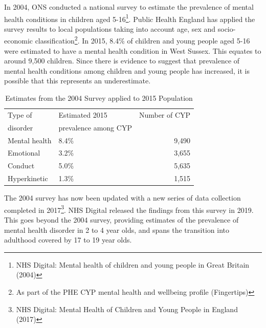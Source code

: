 In 2004, ONS conducted a national survey to estimate the prevalence of mental health conditions in children aged 5-16\footnote{NHS Digital: Mental health of children and young people in Great Britain (2004)}. Public Health England has applied the survey results to local populations taking into account age, sex and socio-economic classification\footnote{As part of the PHE CYP mental health and wellbeing profile (Fingertips)}. In 2015, 8.4\% of children and young people aged 5-16 were estimated to have a mental health condition in West Sussex. This equates to around 9,500 children. Since there is evidence to suggest that prevalence of mental health conditions among children and young people has increased, it is possible that this represents an underestimate.%

\begin{table}[hbt]
    \caption{Estimates from the 2004 Survey applied to 2015 Population}
    \centering
    \begin{tabular}{llr}
    \toprule
    Type of & Estimated 2015 & Number of CYP \\
    disorder & prevalence among CYP & \ \\
    \midrule
    Mental health & 8.4\% & 9,490 \\
    Emotional & 3.2\% & 3,655 \\
    Conduct & 5.0\% & 5,635 \\
    Hyperkinetic & 1.3\% & 1,515 \\
    \bottomrule
    \end{tabular}
    \label{tab:yp:mh1}
\end{table}

The 2004 survey has now been updated with a new series of data collection completed in 2017\footnote{NHS Digital: Mental Health of Children and Young People in England (2017)}. NHS Digital released the findings from this survey in 2019. This goes beyond the 2004 survey, providing estimates of the prevalence of mental health disorder in 2 to 4 year olds, and spans the transition into adulthood covered by 17 to 19 year olds.

